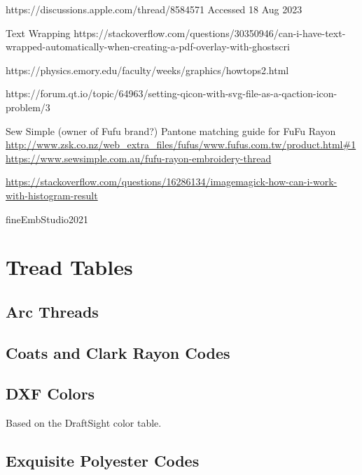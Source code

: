 \documentclass[a4paper]{report}
\begin{document}
https://discussions.apple.com/thread/8584571 Accessed 18 Aug 2023

Text Wrapping
https://stackoverflow.com/questions/30350946/can-i-have-text-wrapped-automatically-when-creating-a-pdf-overlay-with-ghostscri

https://physics.emory.edu/faculty/weeks/graphics/howtops2.html

https://forum.qt.io/topic/64963/setting-qicon-with-svg-file-as-a-qaction-icon-problem/3

Sew Simple (owner of Fufu brand?) Pantone matching guide for FuFu Rayon
\url{http://www.zsk.co.nz/web_extra_files/fufus/www.fufus.com.tw/product.html#1}
\url{https://www.sewsimple.com.au/fufu-rayon-embroidery-thread}

\url{https://stackoverflow.com/questions/16286134/imagemagick-how-can-i-work-with-histogram-result}

fineEmbStudio2021




\appendix

\chapter{Tread Tables}

\section{Arc Threads}

%

%

\section{Coats and Clark Rayon Codes}

%

\section{DXF Colors}

Based on the DraftSight color table.

%

\section{Exquisite Polyester Codes}
\end{document}
